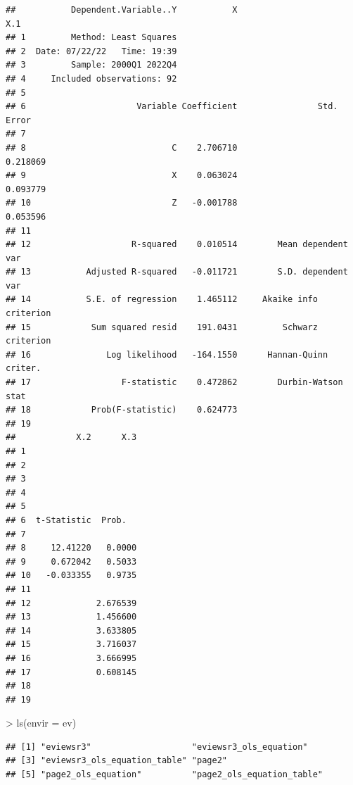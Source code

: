 \documentclass[
]{article}
\newenvironment{Shaded}{\begin{snugshade}}{\end{snugshade}}
\newcommand{\AttributeTok}[1]{\textcolor[rgb]{0.77,0.63,0.00}{#1}}
\newcommand{\FunctionTok}[1]{\textcolor[rgb]{0.00,0.00,0.00}{#1}}
\newcommand{\NormalTok}[1]{#1}
\newcommand{\SpecialCharTok}[1]{\textcolor[rgb]{0.00,0.00,0.00}{#1}}
\begin{document}
\begin{verbatim}
##           Dependent.Variable..Y           X                       X.1
## 1         Method: Least Squares                                      
## 2  Date: 07/22/22   Time: 19:39                                      
## 3         Sample: 2000Q1 2022Q4                                      
## 4     Included observations: 92                                      
## 5                                                                    
## 6                      Variable Coefficient                Std. Error
## 7                                                                    
## 8                             C    2.706710                  0.218069
## 9                             X    0.063024                  0.093779
## 10                            Z   -0.001788                  0.053596
## 11                                                                   
## 12                    R-squared    0.010514        Mean dependent var
## 13           Adjusted R-squared   -0.011721        S.D. dependent var
## 14           S.E. of regression    1.465112     Akaike info criterion
## 15            Sum squared resid    191.0431         Schwarz criterion
## 16               Log likelihood   -164.1550      Hannan-Quinn criter.
## 17                  F-statistic    0.472862        Durbin-Watson stat
## 18            Prob(F-statistic)    0.624773                          
## 19                                                                   
##            X.2      X.3
## 1                      
## 2                      
## 3                      
## 4                      
## 5                      
## 6  t-Statistic  Prob.  
## 7                      
## 8     12.41220   0.0000
## 9     0.672042   0.5033
## 10   -0.033355   0.9735
## 11                     
## 12             2.676539
## 13             1.456600
## 14             3.633805
## 15             3.716037
## 16             3.666995
## 17             0.608145
## 18                     
## 19
\end{verbatim}

\begin{Shaded}
\begin{Highlighting}[]
\SpecialCharTok{\textgreater{}} \FunctionTok{ls}\NormalTok{(}\AttributeTok{envir =}\NormalTok{ ev)}
\end{Highlighting}
\end{Shaded}

\begin{verbatim}
## [1] "eviewsr3"                    "eviewsr3_ols_equation"      
## [3] "eviewsr3_ols_equation_table" "page2"                      
## [5] "page2_ols_equation"          "page2_ols_equation_table"
\end{verbatim}
\end{document}
